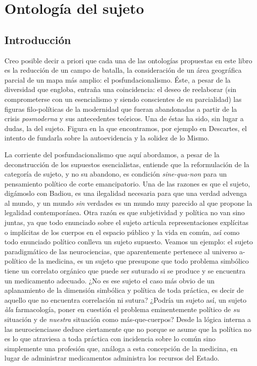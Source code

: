 \documentclass{book}
\begin{document}
\chapter{Ontología del sujeto}
\author{Daniel Groisman}

\hl{}

\section{Introducción}

Creo posible decir a priori que cada una de las ontologías propuestas en
este libro es la reducción de un campo de batalla, la consideración de
un área geográfica parcial de un mapa más amplio: el posfundacionalismo.
Éste, a pesar de la diversidad que engloba, entraña una coincidencia: el
deseo de reelaborar (sin comprometerse con un esencialismo y siendo
conscientes de su parcialidad) las figuras filo-políticas de la
modernidad que fueran abandonadas a partir de la crisis
\emph{posmoderna} y sus antecedentes teóricos. Una de éstas ha sido, sin
lugar a dudas, la del sujeto. Figura en la que encontramos, por ejemplo
en Descartes, el intento de fundarla sobre la autoevidencia y la solidez
de lo Mismo.

La corriente del posfundacionalismo que aquí abordamos, a pesar de la
deconstrucción de los supuestos esencialistas, entiende que la
reformulación de la categoría de sujeto, y no su abandono, es condición
\emph{sine-qua-non} para un pensamiento político de corte emancipatorio.
Una de las razones es que el sujeto, digámoslo con Badiou, es una
ilegalidad necesaria para que una verdad advenga al mundo, y un mundo
\emph{sin} verdades es un mundo muy parecido al que propone la legalidad
contemporánea. Otra razón es que subjetividad y política no van sino
juntas, ya que todo enunciado sobre el sujeto articula representaciones
explícitas o implícitas de los cuerpos en el espacio público y la vida
en común, así como todo enunciado político conlleva un sujeto supuesto.
Veamos un ejemplo: el sujeto paradigmático de las neurociencias, que
aparentemente pertenece al universo a-político de la medicina, es un
sujeto que presupone que todo problema simbólico tiene un correlato
orgánico que puede ser suturado si se produce y se encuentra un
medicamento adecuado. ¿No es ese sujeto el caso más obvio de un
aplanamiento de la dimensión simbólica y política de toda práctica, es
decir de aquello que no encuentra correlación ni sutura? ¿Podría un
sujeto así, un sujeto \emph{àla} farmacología, poner en cuestión el
problema eminentemente político de \emph{su} situación y de
\emph{nuestra} situación como más-que-cuerpos? Desde la lógica interna a
las neurocienciasse deduce ciertamente que no porque se asume que la
política no es lo que atraviesa a toda práctica con incidencia sobre lo
común sino simplemente una profesión que, análoga a esta concepción de
la medicina, en lugar de administrar medicamentos administra los
recursos del Estado.
\end{document}
